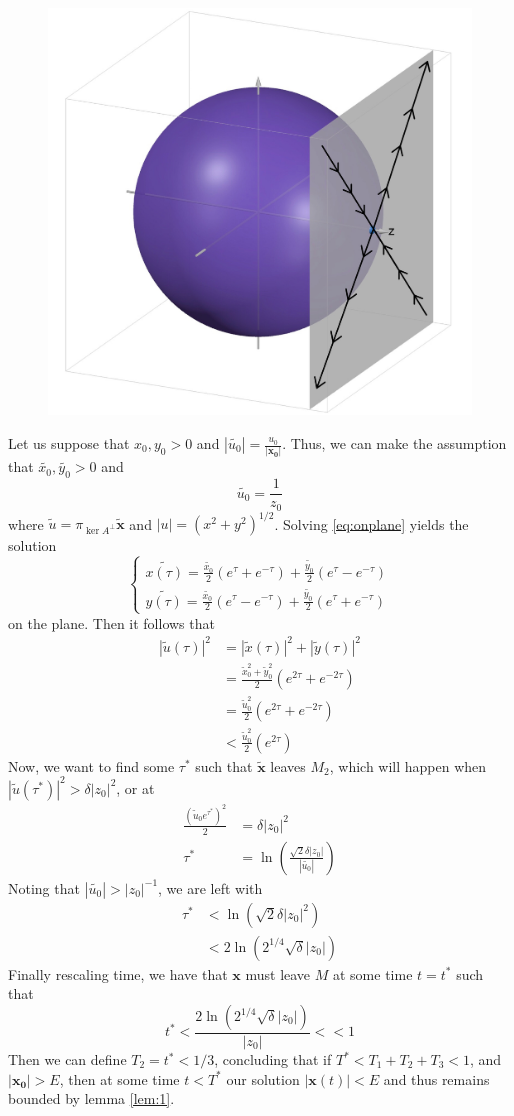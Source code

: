 \documentclass[11pt]{article}
\begin{document}
\begin{figure}[h!]
    \centering
    \includegraphics[width=0.4\linewidth]{proj.jpeg}
    \caption{}
    \label{fig:proj}
\end{figure}
Let us suppose that $x_0, y_0 > 0$ and $|\widetilde{u_0}| = \frac{u_0}{|\mathbf{x_0}|}$. Thus, we can make the assumption that $\widetilde{x_0}, \widetilde{y_0} > 0$ and $$\widetilde{u_0} = \frac{1}{z_0}$$where $\widetilde{u} = \pi_{\ker A^{\perp}}\widetilde{\mathbf{x}}$ and $|u| = (x^2 + y^2)^{1/2}$. Solving \eqref{eq:onplane} yields the solution
\begin{equation}\label{eq:solution}
\begin{cases}
\displaystyle
\widetilde{x(\tau)} = \frac{\widetilde{x_0}}{2}(e^{\tau} + e^{-\tau}) + \frac{\widetilde{y_0}}{2}(e^{\tau} - e^{-\tau})\\

\displaystyle
\widetilde{y(\tau)} = \frac{\widetilde{x_0}}{2}(e^{\tau} - e^{-\tau}) + \frac{\widetilde{y_0}}{2}(e^{\tau} + e^{-\tau})
\end{cases}
\end{equation}on the plane. Then it follows that 
\begin{align*}
    |\widetilde{u}(\tau)|^2 &= |\widetilde{x}(\tau)|^2 + |\widetilde{y}(\tau)|^2\\
    &= \frac{\widetilde{x}_0^2 + \widetilde{y}_0^2}{2}(e^{2\tau} + e^{-2\tau})\\
    &= \frac{\widetilde{u}_0^2}{2}(e^{2\tau} + e^{-2\tau})\\
    & < \frac{\widetilde{u}_0^2}{2}(e^{2\tau})
\end{align*}Now, we want to find some $\tau^*$ such that $\widetilde{\mathbf{x}}$ leaves $M_2$, which will happen when $|\widetilde{u}(\tau^*)|^2 > \delta |z_0|^2$, or at 
\begin{align*}
    \frac{(\widetilde{u}_0e^{\tau^*})^2}{2} &= \delta |z_0|^{2}\\
    \tau^* &= \ln\left(\frac{\sqrt{2}\delta |z_0|}{|\widetilde{u_0}|}\right)
\end{align*}
Noting that $|\widetilde{u_0}| > |z_0|^{-1}$, we are left with
\begin{align*}
    \tau^* &< \ln\left(\sqrt{2}\delta |z_0|^2\right)\\
    &< 2\ln (2^{1/4}\sqrt{\delta}|z_0|)
\end{align*}
Finally rescaling time, we have that $\mathbf{x}$ must leave $M$ at some time $t = t^*$ such that $$t^* < \frac{2\ln (2^{1/4}\sqrt{\delta}|z_0|)}{|z_0|} << 1$$Then we can define $T_2 = t^* < 1/3$, concluding that if $T^* < T_1 + T_2 + T_3 < 1$, and $|\mathbf{x_0}| > E$, then at some time $t < T^*$ our solution $|\mathbf{x}(t)| < E$ and thus remains bounded by lemma \ref{lem:1}. 
\end{document}
